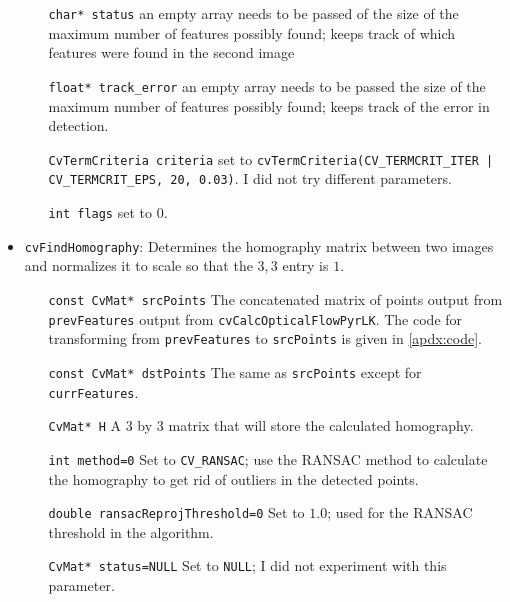\documentclass{article}
\begin{document}
\begin{itemize}
\begin{itemize}
\item[\texttt{char* status}] an empty array needs to be passed of the size of
the maximum number of features possibly found; keeps track of which features
were found in the second image  

\item[\texttt{float* track\_error}] an empty array needs to be passed the size
of the maximum number of features possibly found; keeps track of the error in
detection.  

\item[\texttt{CvTermCriteria\ criteria}] set to
\texttt{cvTermCriteria(CV\_TERMCRIT\_ITER | CV\_TERMCRIT\_EPS, 20, 0.03)}. I did
not try different parameters.  

\item[\texttt{int flags}] set to $0$. 

\end{itemize} 

\item \verb|cvFindHomography|: Determines the homography matrix between two images and normalizes it to scale so that the $3, 3$ entry is $1$. 

\begin{itemize}

\item[\texttt{const CvMat* srcPoints}] The concatenated matrix of points output
from \texttt{prevFeatures} output from \texttt{cvCalcOpticalFlowPyrLK}. The
code for transforming from \texttt{prevFeatures} to \texttt{srcPoints} is given
in \ref{apdx:code}. 

\item[\texttt{const CvMat* dstPoints}] The same as \texttt{srcPoints} except
for \texttt{currFeatures}.  

\item[\texttt{CvMat* H}] A $3$ by $3$ matrix that will store the calculated
homography.  

\item[\texttt{int method=0}] Set to \texttt{CV\_RANSAC}; use the RANSAC method
to calculate the homography to get rid of outliers in the detected points. 

\item[\texttt{double ransacReprojThreshold=0}] Set to $1.0$; used for the
RANSAC threshold in the algorithm.  

\item[\texttt{CvMat* status=NULL}] Set to \texttt{NULL}; I did not experiment
with this parameter.  

\end{itemize} 

\end{itemize}
\end{document}
